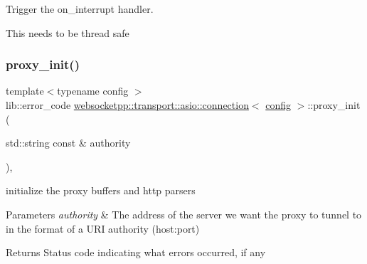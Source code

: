 Trigger the on\+\_\+interrupt handler. 

This needs to be thread safe \mbox{\label{classwebsocketpp_1_1transport_1_1asio_1_1connection_a2397c24d0ab9b344d70328788de721d4}} 
\subsubsection{\texorpdfstring{proxy\+\_\+init()}{proxy\_init()}}
{\footnotesize\ttfamily template$<$typename config $>$ \\
lib\+::error\+\_\+code \mbox{\hyperlink{classwebsocketpp_1_1transport_1_1asio_1_1connection}{websocketpp\+::transport\+::asio\+::connection}}$<$ \mbox{\hyperlink{classconfig}{config}} $>$\+::proxy\+\_\+init (\begin{DoxyParamCaption}\item[{std\+::string const \&}]{authority }\end{DoxyParamCaption})\hspace{0.3cm}{\ttfamily [inline]}, {\ttfamily [protected]}}



initialize the proxy buffers and http parsers 


\begin{DoxyParams}{Parameters}
{\em authority} & The address of the server we want the proxy to tunnel to in the format of a U\+RI authority (host\+:port)\\
\hline
\end{DoxyParams}
\begin{DoxyReturn}{Returns}
Status code indicating what errors occurred, if any 
\end{DoxyReturn}
\mbox{\label{classwebsocketpp_1_1transport_1_1asio_1_1connection_ac6dae6a18678187b7da35f5b064c9ddd}} 
